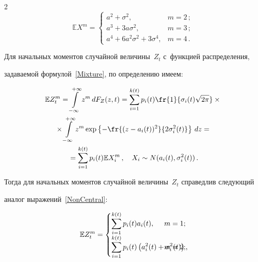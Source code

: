 \begin{multicols}{2}
\begin{equation}

\mathbb{E} X^m=\begin{cases}

a^2+\sigma^2, & m=2\,;\\

a^3+3a\sigma^2, & m=3\,;\\

a^4+6a^2\sigma^2+3\sigma^4, & m=4\,.

\end{cases}\label{NonCentral}

\end{equation}



Для начальных моментов случайной величины~$Z_t$ с~функцией распределения, 

задаваемой формулой~\eqref{Mixture}, по определению имеем:

\begin{multline*}

\mathbb{E} Z_t^m=\int\limits_{-\infty}^{+\infty} z^m\,dF_Z(z,t)=

\sum\limits_{i=1}^{k(t)} p_i(t)\fr{1}{\sigma_i(t)\sqrt{2\pi}}\times{}\\

{}\times 

\int\limits_{-\infty}^{+\infty} z^m\exp\left\{-\fr{(z-a_i(t))^2}

{2\sigma_i^2(t)}\right\} \,dz={}\\

{}=\sum\limits_{i=1}^{k(t)} p_i(t)\mathbb{E} X_i^m\,, \quad 

X_i\sim N(a_i(t),\sigma_i^2(t))\,.

\end{multline*}



Тогда для начальных моментов случайной величины~$Z_t$ справедлив следующий 

аналог выражений~\eqref{NonCentral}:

\begin{equation}

\mathbb{E} Z_t^m=\begin{cases}

\displaystyle\sum\limits_{i=1}^{k(t)} p_i(t) a_i(t), &\hspace*{-15mm} m=1;\\

\displaystyle\sum\limits_{i=1}^{k(t)} p_i(t)\left(a_i^2(t)+\sigma_i^2(t)\right), &\hspace*{-15mm} m=2;\\


\end{cases}
\end{equation}
\end{multicols}
